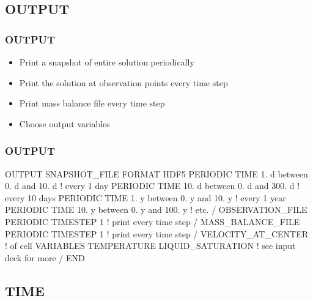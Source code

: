 \documentclass{beamer}
\newcommand\redcomment[1]{{{\color{red} #1}}}
\newcommand\bluecomment[1]{{{\color{blue} #1}}}
\begin{document}
\subsection{OUTPUT}

\begin{frame}[fragile]\frametitle{OUTPUT}
\begin{itemize}
  \item Print a \redcomment{snapshot} of entire solution periodically
  \item Print the solution at \redcomment{observation points} every time step
  \item Print \redcomment{mass balance} file every time step
  \item Choose output \redcomment{variables}
\end{itemize}

\end{frame}

\begin{frame}[fragile]\frametitle{OUTPUT}

\begin{semiverbatim}\small
OUTPUT
  SNAPSHOT_FILE
    FORMAT HDF5
    PERIODIC TIME 1. d between 0. d and 10. d  \bluecomment{! every 1 day}
    PERIODIC TIME 10. d between 0. d and 300. d  \bluecomment{! every 10 days}
    PERIODIC TIME 1. y between 0. y and 10. y \bluecomment{! every 1 year}
    PERIODIC TIME 10. y between 0. y and 100. y \bluecomment{! etc.}
  /
  OBSERVATION_FILE
    PERIODIC TIMESTEP 1 \bluecomment{! print every time step}
  /
  MASS_BALANCE_FILE
    PERIODIC TIMESTEP 1 \bluecomment{! print every time step}
  /
  VELOCITY_AT_CENTER    \bluecomment{! of cell}
  VARIABLES
    TEMPERATURE
    LIQUID_SATURATION   \bluecomment{! see input deck for more}
  /
END
\end{semiverbatim}

\end{frame}

\subsection{TIME}
\end{document}
